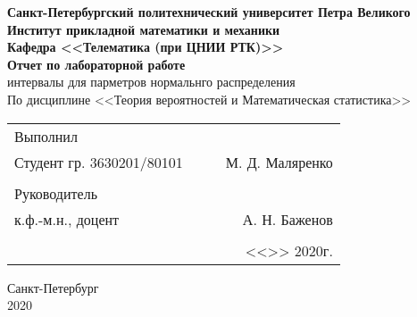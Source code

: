 \documentclass[12pt]{article}
\begin{document}
\begin{titlepage}
	\begin{center}
		\hfill \break
		{\textbf{Санкт-Петербургский политехнический университет Петра Великого}}\\
		\hfill \break
		\textbf{Институт прикладной математики и механики}\\
		 \hfill \break
		\textbf{Кафедра <<Телематика (при ЦНИИ РТК)>>}\\
		\vfill
		\large{\bfseries Отчет по лабораторной работе}\\
		\hfill \break
		\hfill \break
		\hfill \break
		\hfill \break
        \normalsize{ интервалы для парметров нормальнго распределения}\\
        \hfill \break
		По дисциплине <<Теория вероятностей и Математическая статистика>>\\
		\hfill \break
		\hfill \break
	\end{center}
 
	\normalsize
	{ 
		\begin{tabular}{lp{2cm}cr}
			Выполнил &&&\\
			Студент гр. 3630201/80101&&\underline{\hspace{1.5cm}}& М. Д. Маляренко\\\\
			Руководитель&&&\\ 
			к.ф.-м.н., доцент && \underline{\hspace{1.5cm}}& А. Н. Баженов \\\\
			&&&<<\underline{\phantom{333}}>>\underline{\phantom{сентября000}}
			2020г.
		\end{tabular}
	}
\vfill

\begin{center} Санкт-Петербург \\2020 \end{center}
\end{titlepage}

\newpage

\setcounter{page}{2}
\end{document}

